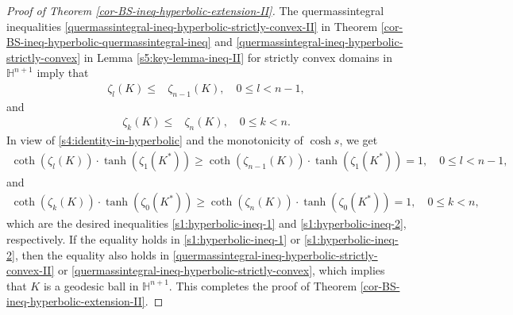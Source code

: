 \documentclass[11pt,reqno]{amsart}
\theoremstyle{definition}
\theoremstyle{remark}
\numberwithin{equation}{section}
\renewcommand{\(}{\left(}
\renewcommand{\)}{\right)}
\renewcommand{\~}{\tilde}
\renewcommand{\-}{\overline}
\begin{document}
\begin{proof}[Proof of Theorem \ref{cor-BS-ineq-hyperbolic-extension-II}]
	The quermassintegral inequalities \eqref{quermassintegral-ineq-hyperbolic-strictly-convex-II} in Theorem \ref{cor-BS-ineq-hyperbolic-quermassintegral-ineq} and \eqref{quermassintegral-ineq-hyperbolic-strictly-convex} in Lemma \ref{s5:key-lemma-ineq-II} for strictly convex domains in $\mathbb H^{n+1}$ imply that
	\begin{align*}
	\zeta_l(K) \leq & \zeta_{n-1}(K), \quad 0\leq l<n-1,
	\end{align*}
	and
	\begin{align*}
	\zeta_k(K) \leq & \zeta_{n}(K), \quad 0\leq k<n.
	\end{align*}
	In view of \eqref{s4:identity-in-hyperbolic} and the monotonicity of $\cosh s$, we get
	\begin{align*}
	\coth(\zeta_l(K)) \cdot \tanh(\zeta_{1}(K^\ast)) \geq \coth(\zeta_{n-1}(K)) \cdot \tanh(\zeta_{1}(K^\ast))=1, \quad 0\leq l<n-1,
	\end{align*}
	and
	\begin{align*}
	\coth(\zeta_k(K)) \cdot \tanh(\zeta_{0}(K^\ast)) \geq \coth(\zeta_{n}(K)) \cdot \tanh(\zeta_{0}(K^\ast))=1, \quad 0\leq k<n,
	\end{align*}
	which are the desired inequalities \eqref{s1:hyperbolic-ineq-1} and \eqref{s1:hyperbolic-ineq-2}, respectively. If the equality holds in \eqref{s1:hyperbolic-ineq-1} or \eqref{s1:hyperbolic-ineq-2}, then the equality also holds in \eqref{quermassintegral-ineq-hyperbolic-strictly-convex-II} or \eqref{quermassintegral-ineq-hyperbolic-strictly-convex}, which implies that $K$ is a geodesic ball in $\mathbb H^{n+1}$. This completes the proof of Theorem \ref{cor-BS-ineq-hyperbolic-extension-II}.	
\end{proof}
\end{document}
